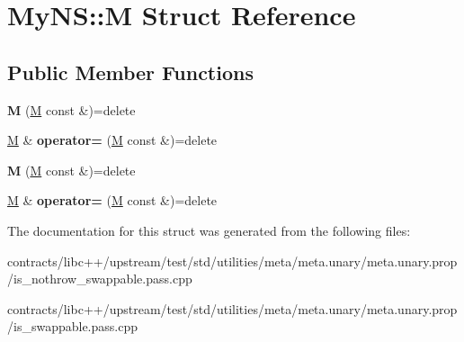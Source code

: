 \hypertarget{struct_my_n_s_1_1_m}{}\section{My\+NS\+:\+:M Struct Reference}
\label{struct_my_n_s_1_1_m}
\subsection*{Public Member Functions}
\begin{DoxyCompactItemize}
\item 
\mbox{\label{struct_my_n_s_1_1_m_ac8735d5aff6a8076830f25dfef044299}} 
{\bfseries M} (\mbox{\hyperlink{struct_my_n_s_1_1_m}{M}} const \&)=delete
\item 
\mbox{\label{struct_my_n_s_1_1_m_a47f1e501d0a70fa2e885261b1d546744}} 
\mbox{\hyperlink{struct_my_n_s_1_1_m}{M}} \& {\bfseries operator=} (\mbox{\hyperlink{struct_my_n_s_1_1_m}{M}} const \&)=delete
\item 
\mbox{\label{struct_my_n_s_1_1_m_ac8735d5aff6a8076830f25dfef044299}} 
{\bfseries M} (\mbox{\hyperlink{struct_my_n_s_1_1_m}{M}} const \&)=delete
\item 
\mbox{\label{struct_my_n_s_1_1_m_a47f1e501d0a70fa2e885261b1d546744}} 
\mbox{\hyperlink{struct_my_n_s_1_1_m}{M}} \& {\bfseries operator=} (\mbox{\hyperlink{struct_my_n_s_1_1_m}{M}} const \&)=delete
\end{DoxyCompactItemize}


The documentation for this struct was generated from the following files\+:\begin{DoxyCompactItemize}
\item 
contracts/libc++/upstream/test/std/utilities/meta/meta.\+unary/meta.\+unary.\+prop/is\+\_\+nothrow\+\_\+swappable.\+pass.\+cpp\item 
contracts/libc++/upstream/test/std/utilities/meta/meta.\+unary/meta.\+unary.\+prop/is\+\_\+swappable.\+pass.\+cpp\end{DoxyCompactItemize}
